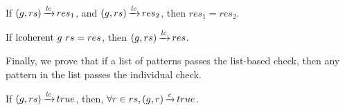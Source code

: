 \begin{lemma}
    If $(g,rs) \operatorname{\xrightarrow{\mathit{lc}}} res_1$,
    and $(g,rs) \operatorname{\xrightarrow{\mathit{lc}}} res_2$,
    then $res_1 = res_2$.
    \label{lemma:lcoherent-determinism}
\end{lemma}

\begin{lemma}
    If $\text{lcoherent}{}\ g\ rs = res$,
    then $(g,rs) \operatorname{\xrightarrow{\mathit{lc}}} res$.
    \label{lemma:lcoherent-follows}
\end{lemma}

Finally, we prove that
if a list of patterns passes the list-based check,
then any pattern in the list passes the individual check.

\begin{lemma}%
    \label{lemma:lcoherent-safety}
    If $(g,rs) \operatorname{\xrightarrow{\mathit{lc}}} true$,
    then, $\forall r \in rs, (g,r) \operatorname{\xrightarrow{\mathit{c}}} true$.
\end{lemma}
